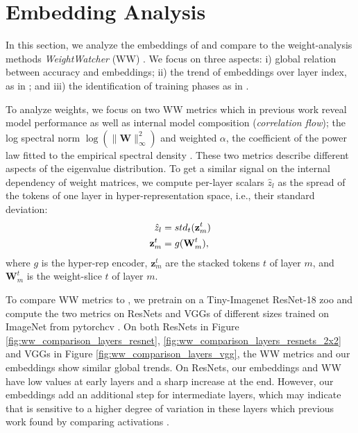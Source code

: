 \vspace{-4pt}
\section{Embedding Analysis}
\vspace{-2pt}
In this section, we analyze the embeddings of \ourmethod and compare to the weight-analysis methods \textit{WeightWatcher} (WW) \citep{martinPredictingTrendsQuality2021}. 
We focus on three aspects: 
i) global relation between accuracy and embeddings; 
ii) the trend of embeddings over layer index, as in  \citep{martinPredictingTrendsQuality2021}; and
iii) the identification of training phases as in \citep{martinTraditionalHeavyTailedSelf2019,martinImplicitSelfregularizationDeep2021}.
\vspace{-2pt}

To analyze weights, we focus on two WW metrics which in previous work reveal model performance as well as internal model composition (\textit{correlation flow}); the log spectral norm $\log(\| \mathbf{W}\|^2_{\infty})$ and weighted $\alpha$, the coefficient of the power law fitted to the empirical spectral density \citep{martinPredictingTrendsQuality2021}. 
These two metrics describe different aspects of the eigenvalue distribution. 
To get a similar signal on the internal dependency of weight matrices, we compute per-layer scalars $\hat{z}_l$ as the spread of the tokens of one layer in hyper-representation space, i.e., their standard deviation: 
\begin{align}
\vspace{-4pt}
    \hat{z}_l &=  std_t(\textbf{z}^t_m) \\
    \textbf{z}^t_m &= g(\textbf{W}^t_m),
\vspace{-4pt}
\end{align}
where $g$ is the hyper-rep encoder, $\textbf{z}^t_m$ are the stacked tokens $t$ of layer $m$, and $\textbf{W}^t_m$ is the weight-slice $t$ of layer $m$.
%
\vspace{-2pt}

To compare WW metrics to \ourmethod,
we pretrain \ourmethod on a Tiny-Imagenet ResNet-18 zoo and compute the two metrics on ResNets and VGGs of different sizes trained on ImageNet from pytorchcv \citep{semeryOsmrImgclsmob2024}.
On both ResNets in Figure \ref{fig:ww_comparison_layers_resnet}, \ref{fig:ww_comparison_layers_resnets_2x2} and VGGs in Figure \ref{fig:ww_comparison_layers_vgg}, the WW metrics and our embeddings show similar global trends. 
On ResNets, our embeddings and WW have low values at early layers and a sharp increase at the end. 
However, our embeddings add an additional step for intermediate layers, which may indicate that \ourmethod is sensitive to a higher degree of variation in these layers which previous work found by comparing activations \citep{kornblithSimilarityNeuralNetwork2019}. 


